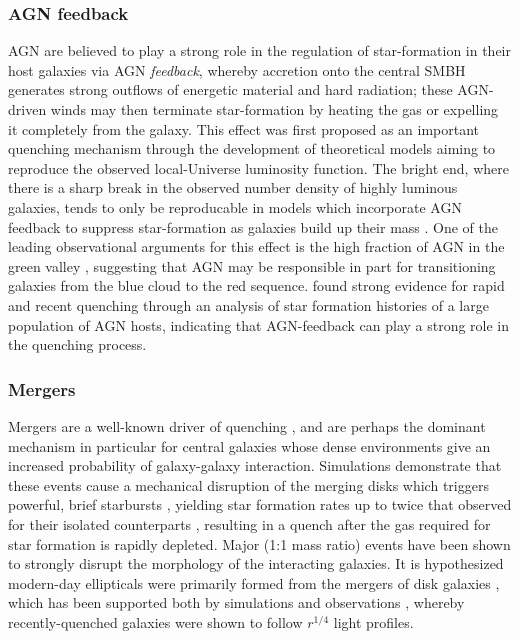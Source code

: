 \subsubsection{AGN feedback}
AGN are believed to play a strong role in the regulation of star-formation in their host galaxies via AGN \emph{feedback}, whereby accretion onto the central SMBH generates strong outflows of energetic material and hard radiation; these AGN-driven winds may then terminate star-formation by heating the gas or expelling it completely from the galaxy. This effect was first proposed as an important quenching mechanism through the development of theoretical models aiming to reproduce the observed local-Universe luminosity function. The bright end, where there is a sharp break in the observed number density of highly luminous galaxies, tends to only be reproducable in models which incorporate AGN feedback to suppress star-formation as galaxies build up their mass \citep{Benson2003, DiMatteo2005, Bower2006, Croton2006, Somerville2008}. One of the leading observational arguments for this effect is the high fraction of AGN in the green valley \citep{Martin2007a,Schawinski2010}, suggesting that AGN may be responsible in part for transitioning galaxies from the blue cloud to the red sequence. \citet{Smethurst2016} found strong evidence for rapid and recent quenching through an analysis of star formation histories of a large population of AGN hosts, indicating that AGN-feedback can play a strong role in the quenching process.  

\subsubsection{Mergers}
Mergers are a well-known driver of quenching \citep{Peng2010}, and are perhaps the dominant mechanism in particular for central galaxies \citet{Smethurst2017} whose dense environments give an increased probability of galaxy-galaxy interaction. Simulations demonstrate that these events cause a mechanical disruption of the merging disks \citep{Pontzen2017} which triggers powerful, brief starbursts \citep{Barnes1996,Hopkins2006}, yielding star formation rates up to twice that observed for their isolated counterparts \citep{Mihos1994}, resulting in a quench after the gas required for star formation is rapidly depleted. Major (1:1 mass ratio) events have been shown to strongly disrupt the morphology of the interacting galaxies. It is hypothesized modern-day ellipticals were primarily formed from the mergers of disk galaxies \citep{Toomre1977,Schweizer1982,Schweizer1990}, which has been supported both by simulations \citep{Mihos1996,Pontzen2017} and observations \citep{Schweizer1982,Wright1990,Stanford1991}, whereby recently-quenched galaxies were shown to follow $r^{1/4}$ light profiles. 


